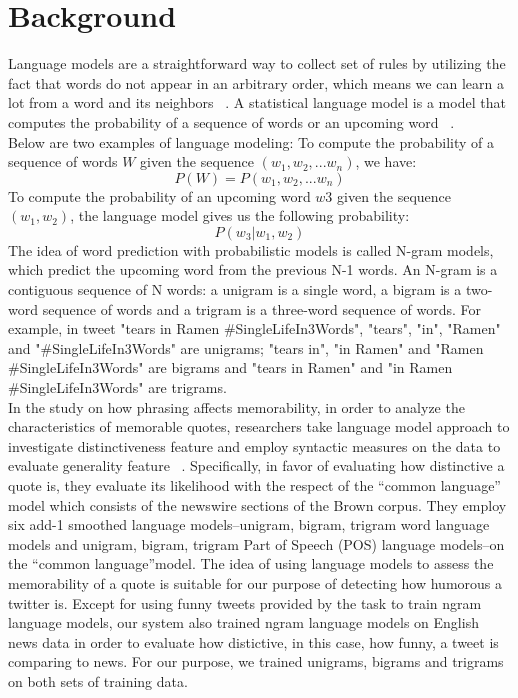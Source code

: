 \documentclass[11pt,a4paper]{article}
\begin{document}
\section{Background}
Language models are a straightforward way to collect set of rules by utilizing the fact that words do not appear in an arbitrary order, which means we can learn a lot from a word and its neighbors ~\cite{de2011natural}. A statistical language model is a model that computes the probability of a sequence of words or an upcoming word ~\cite{JM}.\\
Below are two examples of language modeling:
To compute the probability of a sequence of words $W$ given the sequence $(w_{1},w_{2},...w_{n})$, we have:
\begin{equation}
P(W) = P(w_{1},w_{2},...w_{n})
\end{equation}
To compute the probability of an upcoming word $w3$ given the sequence $(w_{1},w_{2})$, the language model gives us the following probability:
\begin{equation}
P(w_{3}|w_{1},w_{2})
\end{equation}
The idea of word prediction with probabilistic models is called N-gram models, which predict the upcoming word from the previous N-1 words. An N-gram is a contiguous sequence of N words: a unigram is a single word, a bigram is a two-word sequence of words and a trigram is a three-word sequence of words. For example, in tweet "tears in Ramen \#SingleLifeIn3Words", "tears", "in", "Ramen" and "\#SingleLifeIn3Words" are unigrams; "tears in", "in Ramen" and "Ramen \#SingleLifeIn3Words" are bigrams and "tears in Ramen" and "in Ramen \#SingleLifeIn3Words" are trigrams.\\
In the study on how phrasing affects memorability, in order to analyze the characteristics of memorable quotes, researchers take
language model approach to investigate distinctiveness feature and employ syntactic measures on the data to evaluate generality feature ~\cite{hello}. Specifically, in favor of evaluating how distinctive a quote is, they evaluate its likelihood with the respect of the “common language” model which consists of the newswire sections of the Brown corpus. They employ six add-1 smoothed language models–unigram, bigram, trigram word language models and unigram, bigram, trigram Part of Speech (POS) language models–on the “common language”model. The idea of using language models to assess the memorability of a quote is suitable for our purpose of detecting how humorous a twitter is. Except for using funny tweets provided by the task to train ngram language models, our system also trained ngram language models on English news data in order to evaluate how distictive, in this case, how funny, a tweet is comparing to news. For our purpose, we trained unigrams, bigrams and trigrams on both sets of training data.
\end{document}
